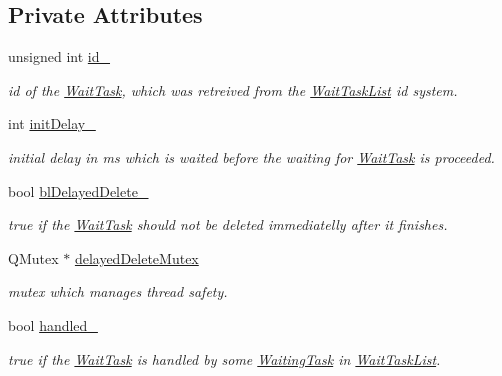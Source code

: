 \subsection*{Private Attributes}
\begin{DoxyCompactItemize}
\item 
\hypertarget{class_wait_task_a0dcba6c8771739ede9d99fe2ec797536}{}unsigned int \hyperlink{class_wait_task_a0dcba6c8771739ede9d99fe2ec797536}{id\+\_\+}\label{class_wait_task_a0dcba6c8771739ede9d99fe2ec797536}

\begin{DoxyCompactList}\small\item\em id of the \hyperlink{class_wait_task}{Wait\+Task}, which was retreived from the \hyperlink{class_wait_task_list}{Wait\+Task\+List} id system. \end{DoxyCompactList}\item 
\hypertarget{class_wait_task_a37036e5f62e2edcdf7ae6e98d221aa64}{}int \hyperlink{class_wait_task_a37036e5f62e2edcdf7ae6e98d221aa64}{init\+Delay\+\_\+}\label{class_wait_task_a37036e5f62e2edcdf7ae6e98d221aa64}

\begin{DoxyCompactList}\small\item\em initial delay in ms which is waited before the waiting for \hyperlink{class_wait_task}{Wait\+Task} is proceeded. \end{DoxyCompactList}\item 
\hypertarget{class_wait_task_aaac2268db578ccf6ec74b1ab07c2bf04}{}bool \hyperlink{class_wait_task_aaac2268db578ccf6ec74b1ab07c2bf04}{bl\+Delayed\+Delete\+\_\+}\label{class_wait_task_aaac2268db578ccf6ec74b1ab07c2bf04}

\begin{DoxyCompactList}\small\item\em true if the \hyperlink{class_wait_task}{Wait\+Task} should not be deleted immediatelly after it finishes. \end{DoxyCompactList}\item 
\hypertarget{class_wait_task_a3c01a70426e88f4ce098533c2029db7e}{}Q\+Mutex $\ast$ \hyperlink{class_wait_task_a3c01a70426e88f4ce098533c2029db7e}{delayed\+Delete\+Mutex}\label{class_wait_task_a3c01a70426e88f4ce098533c2029db7e}

\begin{DoxyCompactList}\small\item\em mutex which manages thread safety. \end{DoxyCompactList}\item 
\hypertarget{class_wait_task_a9af35161099d8dbc938dfc6a00541ca0}{}bool \hyperlink{class_wait_task_a9af35161099d8dbc938dfc6a00541ca0}{handled\+\_\+}\label{class_wait_task_a9af35161099d8dbc938dfc6a00541ca0}

\begin{DoxyCompactList}\small\item\em true if the \hyperlink{class_wait_task}{Wait\+Task} is handled by some \hyperlink{class_waiting_task}{Waiting\+Task} in \hyperlink{class_wait_task_list}{Wait\+Task\+List}. \end{DoxyCompactList}\end{DoxyCompactItemize}


